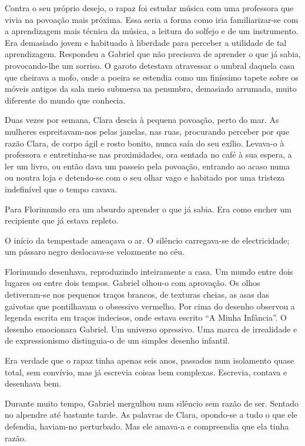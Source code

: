 Contra o seu próprio desejo, o rapaz foi estudar música com uma
professora que vivia na povoação mais próxima. Essa seria a forma como
iria familiarizar-se com a aprendizagem mais técnica da música, a
leitura do solfejo e de um instrumento. Era demasiado jovem e habituado
à liberdade para perceber a utilidade de tal aprendizagem. Respondeu a
Gabriel que não precisava de aprender o que já sabia, provocando-lhe um
sorriso. O garoto detestava atravessar o umbral daquela casa que
cheirava a mofo, onde a poeira se estendia como um finíssimo tapete
sobre os móveis antigos da sala meio submersa na penumbra, demasiado
arrumada, muito diferente do mundo que conhecia.

Duas vezes por semana, Clara descia à pequena povoação, perto do mar. As
mulheres espreitavam-nos pelas janelas, nas ruas, procurando perceber
por que razão Clara, de corpo ágil e rosto bonito, nunca saía do seu
exílio. Levava-o à professora e entretinha-se nas proximidades, ora
sentada no café à sua espera, a ler um livro, ou então dava um passeio
pela povoação, entrando ao acaso numa ou noutra loja e detendo-se com o
seu olhar vago e habitado por uma tristeza indefinível que o tempo
cavava.

Para Florimundo era um absurdo aprender o que já sabia. Era como encher
um recipiente que já estava repleto.

O início da tempestade ameaçava o ar. O silêncio carregava-se de
electricidade; um pássaro negro deslocava-se velozmente no céu.

Florimundo desenhava, reproduzindo inteiramente a casa. Um mundo entre
dois lugares ou entre dois tempos. Gabriel olhou-o com aprovação. Os
olhos detiveram-se nos pequenos traços brancos, de texturas cheias, as
asas das gaivotas que pontilhavam o obsessivo vermelho. Por cima do
desenho observou a legenda escrita em traços indecisos, onde estava
escrito ``A Minha Infância''. O desenho emocionara Gabriel. Um universo
opressivo. Uma marca de irrealidade e de expressionismo distinguia-o de
um simples desenho infantil.

Era verdade que o rapaz tinha apenas seis anos, passados num isolamento
quase total, sem convívio, mas já escrevia coisas bem complexas.
Escrevia, contava e desenhava bem.

Durante muito tempo, Gabriel mergulhou num silêncio sem razão de ser.
Sentado no alpendre até bastante tarde. As palavras de Clara, opondo-se
a tudo o que ele defendia, haviam-no perturbado. Mas ele amava-a e
compreendia que ela tinha razão.

